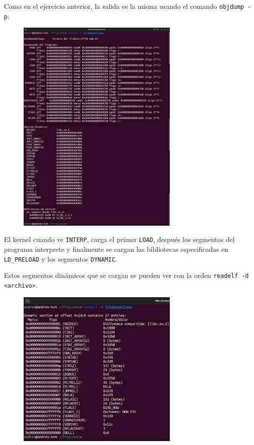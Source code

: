 \documentclass{article}
\begin{document}
Como en el ejercicio anterior, la salida es la misma usando el comando \verb|objdump -p|:

\begin{figure}[H]
    \centering
    \includegraphics[width=0.7\textwidth]{imagenes/objdumppsleep.png}
\end{figure}

El kernel cuando ve \texttt{INTERP}, carga el primer \texttt{LOAD}, después los segmentos del programa interprete y finalmente se cargan las bibliotecas especificadas en \texttt{LD\_PRELOAD} y los segmentos \texttt{DYNAMIC}. 

\bigskip

Estos segmentos dinámicos que se cargan se pueden ver con la orden \verb|readelf -d <archivo>|.

\begin{figure}[H]
    \centering
    \includegraphics[width=0.7\textwidth]{imagenes/Captura desde 2022-11-17 18-47-41.png}
\end{figure}
\end{document}
